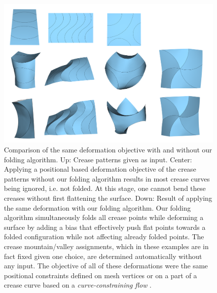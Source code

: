 \begin{figure} [h]
	\centering
	\includegraphics[width=\linewidth]{figures/fold_bias_compare}
	\caption{Comparison of the same deformation objective with and without our folding algorithm. Up: Crease patterns given as input. Center: Applying a positional based deformation objective of the crease patterns without our folding algorithm results in most crease curves being ignored, i.e. not folded. At this stage, one cannot bend these creases without first flattening the surface. Down: Result of applying the same deformation with our folding algorithm. Our folding algorithm simultaneously folds all crease points while deforming a surface by adding a bias that effectively push flat points towards a folded configuration while not affecting already folded points. The crease mountain/valley assignments, which in these examples are in fact fixed given one choice, are determined automatically without any input. The objective of all of these deformations were the same positional constraints defined on mesh vertices or on a part of a crease curve based on a \textit{curve-constraining flow} \cite{rabi2018shape}.}
	\label{fig:folded_and_not_folded}
\end{figure}